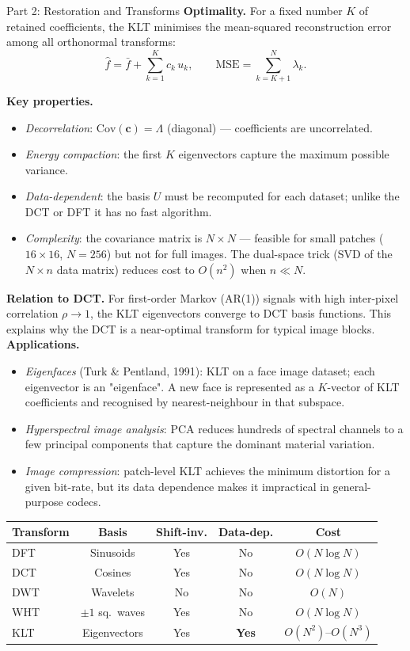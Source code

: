 \documentclass[letterpaper]{article}
\begin{document}
\begin{notes}{Part 2: Restoration and Transforms}
\textbf{Optimality.} For a fixed number $K$ of retained coefficients, the KLT minimises the mean-squared reconstruction error among all orthonormal transforms:
$$\hat{f} = \bar{f} + \sum_{k=1}^K c_k\,u_k, \qquad \text{MSE} = \sum_{k=K+1}^N \lambda_k.$$

\textbf{Key properties.}
\begin{itemize}
    \item \emph{Decorrelation}: $\mathrm{Cov}(\mathbf{c}) = \Lambda$ (diagonal) — coefficients are uncorrelated.
    \item \emph{Energy compaction}: the first $K$ eigenvectors capture the maximum possible variance.
    \item \emph{Data-dependent}: the basis $U$ must be recomputed for each dataset; unlike the DCT or DFT it has no fast algorithm.
    \item \emph{Complexity}: the covariance matrix is $N\times N$ — feasible for small patches ($16\times16$, $N=256$) but not for full images. The dual-space trick (SVD of the $N\times n$ data matrix) reduces cost to $O(n^2)$ when $n \ll N$.
\end{itemize}

\textbf{Relation to DCT.} For first-order Markov (AR(1)) signals with high inter-pixel correlation $\rho\to1$, the KLT eigenvectors converge to DCT basis functions. This explains why the DCT is a near-optimal transform for typical image blocks.\\

\textbf{Applications.}
\begin{itemize}
    \item \emph{Eigenfaces} (Turk \& Pentland, 1991): KLT on a face image dataset; each eigenvector is an "eigenface". A new face is represented as a $K$-vector of KLT coefficients and recognised by nearest-neighbour in that subspace.
    \item \emph{Hyperspectral image analysis}: PCA reduces hundreds of spectral channels to a few principal components that capture the dominant material variation.
    \item \emph{Image compression}: patch-level KLT achieves the minimum distortion for a given bit-rate, but its data dependence makes it impractical in general-purpose codecs.
\end{itemize}

\begin{center}
\begin{tabular}{@{}lcccc@{}}
\toprule
Transform & Basis & Shift-inv. & Data-dep. & Cost \\
\midrule
DFT  & Sinusoids & Yes & No & $O(N\log N)$ \\
DCT  & Cosines   & Yes & No & $O(N\log N)$ \\
DWT  & Wavelets  & No  & No & $O(N)$ \\
WHT  & $\pm1$ sq.\ waves & Yes & No & $O(N\log N)$ \\
KLT  & Eigenvectors & Yes & \textbf{Yes} & $O(N^2)$--$O(N^3)$ \\
\bottomrule
\end{tabular}
\end{center}




\end{notes}
\end{document}
